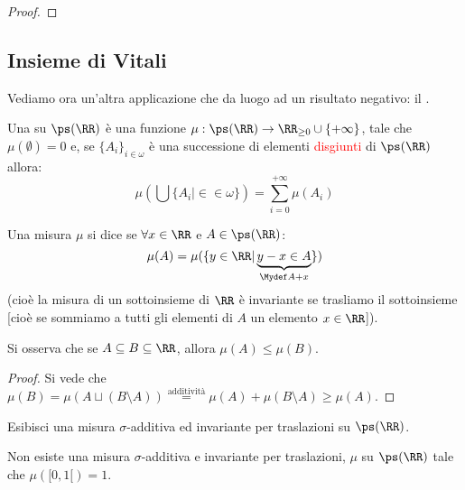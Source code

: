 \documentclass[11pt]{scrartcl}
\begin{document}
\begin{proof}
	
\end{proof}

\subsection{Insieme di Vitali}

Vediamo ora un'altra applicazione che da luogo ad un risultato negativo: il .

\begin{definition}
	Una  su $\ps(\RR)$ è una funzione $\mu : \ps(\RR) \rightarrow \RR_{\geq 0}\cup\{+\infty\}$, tale che $\mu(\emptyset) = 0$ e, se $\{A_i\}_{i \in \omega}$ è 
	una successione di elementi \textcolor{red}{disgiunti} di $\ps(\RR)$ allora:
	\[ \mu\left(\bigcup\{A_i | \in \in \omega\}\right) = \sum_{i = 0}^{+\infty} \mu(A_i)
		\]
\end{definition}

\begin{definition}
	Una misura $\mu$ si dice  se $\forall x \in \RR$ e $A \in \ps(\RR)$:
	\[ \mu(A) = \mu(\{y \in \RR | \underbrace{y - x \in A}_{\Mydef A + x}\})
		\]
	(cioè la misura di un sottoinsieme di $\RR$ è invariante se trasliamo il sottoinsieme [cioè se sommiamo a tutti gli elementi di $A$ un elemento $x \in \RR$]).
\end{definition}

\begin{remark}
	Si osserva che se $A \subseteq B \subseteq \RR$, allora $\mu(A) \leq \mu(B)$.
\end{remark}

\begin{proof}
	Si vede che $\mu(B) = \mu(A \sqcup (B \setminus A)) \overset{\text{additività}}{=} \mu(A) + \mu(B \setminus A) \geq \mu(A)$.
\end{proof}

\begin{exercise}
	Esibisci una misura $\sigma$-additiva ed invariante per traslazioni su $\ps(\RR)$.
\end{exercise}

\begin{proposition}
	Non esiste una misura $\sigma$-additiva e invariante per traslazioni, $\mu$ su $\ps(\RR)$ tale che $\mu([0,1[) = 1$.
\end{proposition}
\end{document}
